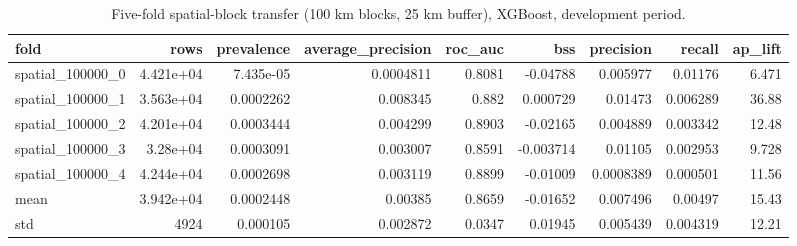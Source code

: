 \begin{table}
\caption{Five-fold spatial-block transfer (100 km blocks, 25 km buffer), XGBoost, development period.}
\label{tab:T6_spatial_blocks}
\begin{tabular}{lrrrrrrrr}
\toprule
fold & rows & prevalence & average_precision & roc_auc & bss & precision & recall & ap_lift \\
\midrule
spatial_100000_0 & 4.421e+04 & 7.435e-05 & 0.0004811 & 0.8081 & -0.04788 & 0.005977 & 0.01176 & 6.471 \\
spatial_100000_1 & 3.563e+04 & 0.0002262 & 0.008345 & 0.882 & 0.000729 & 0.01473 & 0.006289 & 36.88 \\
spatial_100000_2 & 4.201e+04 & 0.0003444 & 0.004299 & 0.8903 & -0.02165 & 0.004889 & 0.003342 & 12.48 \\
spatial_100000_3 & 3.28e+04 & 0.0003091 & 0.003007 & 0.8591 & -0.003714 & 0.01105 & 0.002953 & 9.728 \\
spatial_100000_4 & 4.244e+04 & 0.0002698 & 0.003119 & 0.8899 & -0.01009 & 0.0008389 & 0.000501 & 11.56 \\
mean & 3.942e+04 & 0.0002448 & 0.00385 & 0.8659 & -0.01652 & 0.007496 & 0.00497 & 15.43 \\
std & 4924 & 0.000105 & 0.002872 & 0.0347 & 0.01945 & 0.005439 & 0.004319 & 12.21 \\
\bottomrule
\end{tabular}
\end{table}
